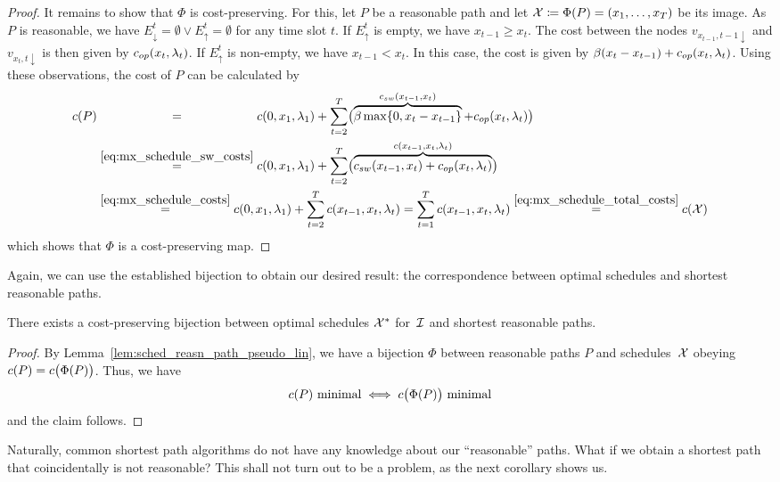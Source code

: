 \begin{proof}
It remains to show that $\Phi$ is cost-preserving. For this, let $P$ be a reasonable path and let $\mathcal{X}\coloneqq\Phi(P)=(x_1,\dotsc,x_T)$ be its image. 
As $P$ is reasonable, we have $E_\downarrow^t=\emptyset \lor E_\uparrow^t=\emptyset$ for any time slot $t$. If $E_\uparrow^t$ is empty, we have $x_{t-1}\ge x_t$. The cost between the nodes $v_{x_{t-1},t-1\downarrow}$ and $v_{x_t,t\downarrow}$ is then given by $c_{op}(x_t,\lambda_t)$. If $E_\uparrow^t$ is non-empty, we have $x_{t-1}<x_t$. In this case, the cost is given by $\beta(x_t-x_{t-1})+c_{op}(x_t,\lambda_t)$. Using these observations, the cost of $P$ can be calculated by 
\begin{align*}
	\costs(P)&\stackrel{\phantom{\eqref{eq:mx_schedule_sw_costs}}}{=}\costs(0,x_1,\lambda_1)+\sum\limits_{t=2}^{T}\bigl(\overbrace{\beta\max\{0,x_t-x_{t-1}\}}^{\swcosts(x_{t-1},x_t)}+\opcosts(x_{t},\lambda_t)\bigr)\\
	&\stackrel{\eqref{eq:mx_schedule_sw_costs}}{=}c(0,x_1,\lambda_1)+\sum\limits_{t=2}^{T}\bigl(\overbrace{\swcosts(x_{t-1},x_t)+\opcosts(x_{t},\lambda_t)}^{\costs(x_{t-1},x_t,\lambda_t)}\bigr)\\
	&\stackrel{\eqref{eq:mx_schedule_costs}}{=}c(0,x_1,\lambda_1)+\sum\limits_{t=2}^{T}\costs(x_{t-1},x_t,\lambda_t)=\sum\limits_{t=1}^{T}\costs(x_{t-1},x_t,\lambda_t)\stackrel{\eqref{eq:mx_schedule_total_costs}}{=}c(\mx)
\end{align*}
which shows that $\Phi$ is a cost-preserving map.
\end{proof}
Again, we can use the established bijection to obtain our desired result: the correspondence between optimal schedules and shortest reasonable paths.
\begin{thm}\label{thm:opt_sched_reasn_path}
There exists a cost-preserving bijection between optimal schedules $\mathcal{X}^*$ for~$\mathcal{I}$ and shortest reasonable paths.
\end{thm} 
\begin{proof}
By Lemma~\ref{lem:sched_reasn_path_pseudo_lin}, we have a bijection $\Phi$ between reasonable paths $P$ and schedules~$\mathcal{X}$ obeying $c(P)=c\bigl(\Phi(P)\bigr)$. Thus, we have 
\begin{equation*}
	c(P)\text{ minimal}\iff c\bigl(\Phi(P)\big)\text{ minimal}
\end{equation*}
and the claim follows.
\end{proof}
Naturally, common shortest path algorithms do not have any knowledge about our ``reasonable'' paths. What if we obtain a shortest path that coincidentally is not reasonable? This shall not turn out to be a problem, as the next corollary shows us.
